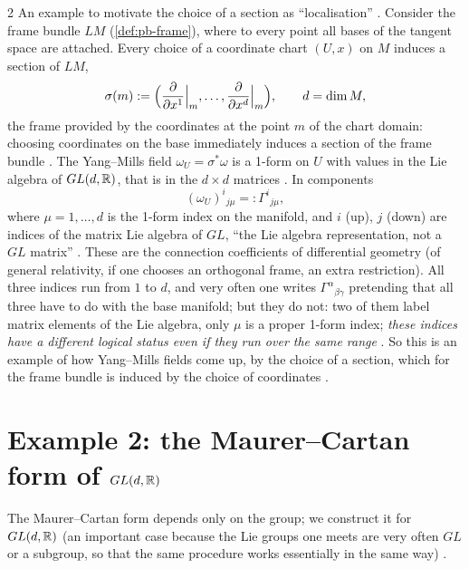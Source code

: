 \begin{paracol}{2}
An example to motivate the choice of a section as ``localisation''   . Consider the frame bundle $LM$ (\cref{def:pb-frame}), where to every point all bases of the tangent space are attached. Every choice of a coordinate chart $(U,x)$ on $M$ induces a section of $LM$,
\[
  \sigma(m):=\Bigl(\frac{\partial}{\partial x^1}\Big|_m,\dots,\frac{\partial}{\partial x^{d}}\Big|_m\Bigr),\qquad d=\dim M,
\]
the frame provided by the coordinates at the point $m$ of the chart domain: choosing coordinates on the base immediately induces a section of the frame bundle      . The Yang--Mills field $\omega_U=\sigma^*\omega$ is a 1-form on $U$ with values in the Lie algebra of $GL(d,\mathbb{R})$, that is in the $d\times d$ matrices  . In components
\[
  (\omega_U)^i{}_{j\mu}=:\Gamma^i{}_{j\mu},
\]
where $\mu=1,\dots,d$ is the 1-form index on the manifold, and $i$ (up), $j$ (down) are indices of the matrix Lie algebra of $GL$, ``the Lie algebra representation, not a $GL$ matrix''   . These are the connection coefficients of differential geometry (of general relativity, if one chooses an orthogonal frame, an extra restriction). All three indices run from $1$ to $d$, and very often one writes $\Gamma^\alpha{}_{\beta\gamma}$ pretending that all three have to do with the base manifold; but they do not: two of them label matrix elements of the Lie algebra, only $\mu$ is a proper 1-form index; \emph{these indices have a different logical status even if they run over the same range}   . So this is an example of how Yang--Mills fields come up, by the choice of a section, which for the frame bundle is induced by the choice of coordinates  .

\section{Example 2: the Maurer--Cartan form of $GL(d,\mathbb{R})$}\label{sec:ym-mc}

The Maurer--Cartan form depends only on the group; we construct it for $GL(d,\mathbb{R})$ (an important case because the Lie groups one meets are very often $GL$ or a subgroup, so that the same procedure works essentially in the same way)    .


\end{paracol}
